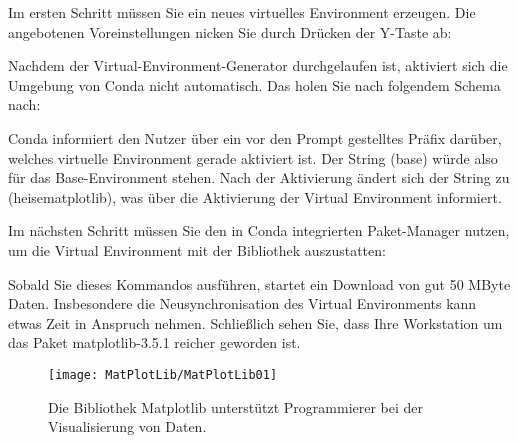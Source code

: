 Im ersten Schritt müssen Sie ein neues virtuelles Environment erzeugen. Die angebotenen Voreinstellungen nicken Sie durch Drücken der Y-Taste ab:

\medskip




\medskip

Nachdem der Virtual-Environment-Generator durchgelaufen ist, aktiviert sich die Umgebung von Conda nicht automatisch. Das holen Sie nach folgendem Schema nach:

\medskip
{}


\medskip

Conda informiert den Nutzer über ein vor den Prompt gestelltes Präfix darüber, welches virtuelle Environment gerade aktiviert ist. Der String (base) würde also für das Base-Environment stehen. Nach der Aktivierung ändert sich der String zu (heisematplotlib), was über die Aktivierung der Virtual Environment informiert.

Im nächsten Schritt müssen Sie den in Conda integrierten Paket-Manager nutzen, um die Virtual Environment mit der Bibliothek auszustatten:

\medskip




\medskip

Sobald Sie dieses Kommandos ausführen, startet ein Download von gut 50 MByte Daten. Insbesondere die Neusynchronisation des Virtual Environments kann etwas Zeit in Anspruch nehmen. Schließlich sehen Sie, dass Ihre Workstation um das Paket matplotlib-3.5.1 reicher geworden ist.

\begin{figure}
  \begin{center}  
    \texttt{[image: MatPlotLib/MatPlotLib01]}      
            
    \caption{Die Bibliothek Matplotlib unterstützt Programmierer bei der Visualisierung von Daten.}\label{Matplotlib01}
  \end{center}    
\end{figure}


